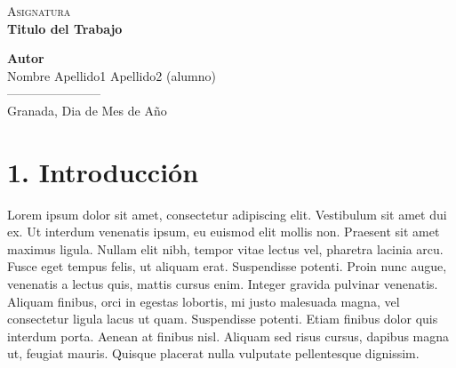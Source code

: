 \documentclass[a4paper,openright,12pt]{report}
\begin{document}
\begin{titlepage}
  
\newlength{\centeroffset}
\setlength{\centeroffset}{-0.5\oddsidemargin}
\addtolength{\centeroffset}{0.5\evensidemargin}
\thispagestyle{empty}
\noindent\hspace*{\centeroffset}

\begin{minipage}{\textwidth}

\centering
\textsc{\Large Asignatura\\[0.5cm]}
\Huge\bfseries Titulo del Trabajo\\

\end{minipage}

\vspace{2.5cm}
\noindent\hspace*{\centeroffset}\begin{minipage}{\textwidth}
\centering
\textbf{Autor}\\ {Nombre Apellido1 Apellido2 (alumno)}\\[2cm]
\textsc{-----------------------}\\Granada, Dia de Mes de Año

\end{minipage}

\end{titlepage}

\setcounter{page}{2}

\tableofcontents

\chapter*{1. Introducción}\label{c_introduccion} 

Lorem ipsum dolor sit amet, consectetur adipiscing elit. Vestibulum sit amet dui ex. Ut interdum venenatis ipsum, eu euismod elit mollis non. Praesent sit amet maximus ligula. Nullam elit nibh, tempor vitae lectus vel, pharetra lacinia arcu. Fusce eget tempus felis, ut aliquam erat. Suspendisse potenti. Proin nunc augue, venenatis a lectus quis, mattis cursus enim. Integer gravida pulvinar venenatis. Aliquam finibus, orci in egestas lobortis, mi justo malesuada magna, vel consectetur ligula lacus ut quam. Suspendisse potenti. Etiam finibus dolor quis interdum porta. Aenean at finibus nisl. Aliquam sed risus cursus, dapibus magna ut, feugiat mauris. Quisque placerat nulla vulputate pellentesque dignissim.
\end{document}
